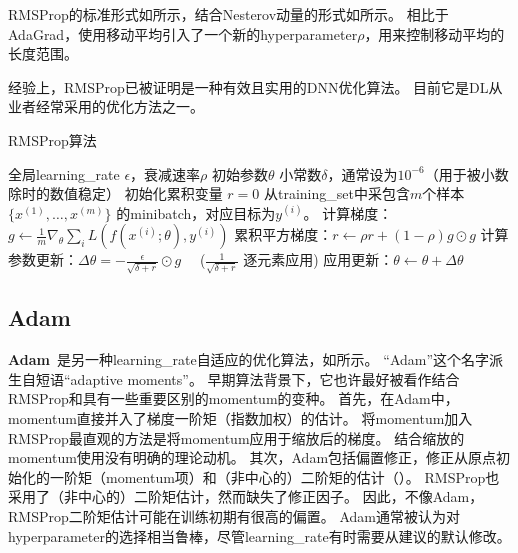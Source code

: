 RMSProp的标准形式如所示，结合Nesterov动量的形式如所示。
相比于AdaGrad，使用移动平均引入了一个新的\gls{hyperparameter}$\rho$，用来控制移动平均的长度范围。

经验上，RMSProp已被证明是一种有效且实用的\gls{DNN}优化算法。
目前它是\gls{DL}从业者经常采用的优化方法之一。


\begin{algorithm}[ht]
	\caption{RMSProp算法}
	\label{alg:rms_prop}
	\begin{algorithmic}
		\REQUIRE 全局\gls{learning_rate} $\epsilon$，衰减速率$\rho$
		\REQUIRE  初始参数$\theta$
		\REQUIRE 小常数$\delta$，通常设为$10^{-6}$（用于被小数除时的数值稳定）
		\STATE 初始化累积变量 $r = 0$
		\STATE 从\gls{training_set}中采包含$m$个样本$\{ x^{(1)},\dots, x^{(m)}\}$ 的\gls{minibatch}，对应目标为$y^{(i)}$。
		\STATE 计算梯度：$g \leftarrow  
		\frac{1}{m} \nabla_{\theta} \sum_i L(f(x^{(i)};\theta),y^{(i)})$ 
		\STATE 累积平方梯度：$r \leftarrow \rho
		r + (1-\rho) g \odot g$
		\STATE 计算参数更新：$\Delta \theta =
		-\frac{\epsilon}{\sqrt{\delta + r}} \odot g$  \ \  ($\frac{1}{\sqrt{\delta + r}}$ 逐元素应用)
		\STATE 应用更新：$\theta \leftarrow \theta + \Delta \theta$
		\ENDWHILE
	\end{algorithmic}
\end{algorithm}

\subsection{Adam}
\label{sec:adam}
\textbf{Adam}~\citep{kingma2014adam}是另一种\gls{learning_rate}自适应的优化算法，如所示。
``Adam''这个名字派生自短语``adaptive moments''。
早期算法背景下，它也许最好被看作结合RMSProp和具有一些重要区别的\gls{momentum}的变种。
首先，在Adam中，\gls{momentum}直接并入了梯度一阶矩（指数加权）的估计。
将\gls{momentum}加入RMSProp最直观的方法是将\gls{momentum}应用于缩放后的梯度。
结合缩放的\gls{momentum}使用没有明确的理论动机。
其次，Adam包括偏置修正，修正从原点初始化的一阶矩（\gls{momentum}项）和（非中心的）二阶矩的估计（）。
RMSProp也采用了（非中心的）二阶矩估计，然而缺失了修正因子。
因此，不像Adam，RMSProp二阶矩估计可能在训练初期有很高的偏置。
Adam通常被认为对\gls{hyperparameter}的选择相当鲁棒，尽管\gls{learning_rate}有时需要从建议的默认修改。

